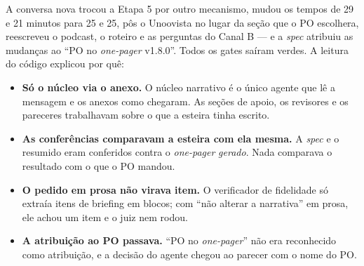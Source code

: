 \documentclass[11pt,a4paper]{article}
\newcommand{\bolinha}[1]{\tikz[baseline=-0.5ex]{\fill[#1] (0,0) circle (0.33em);}}
\newcommand{\statusVerde}{\bolinha{sinalVerde}}
\begin{document}
\begin{center}
\end{center}

A conversa nova trocou a Etapa 5 por outro mecanismo, mudou os tempos de 29 e 21 minutos para 25 e 25, pôs o Unoovista no lugar da seção que o PO escolhera, reescreveu o podcast, o roteiro e as perguntas do Canal B --- e a \emph{spec} atribuiu as mudanças ao ``PO no \emph{one-pager} v1.8.0''. Todos os gates saíram verdes. A leitura do código explicou por quê:

\begin{itemize}
  \item \textbf{Só o núcleo via o anexo.} O núcleo narrativo é o único agente que lê a mensagem e os anexos como chegaram. As seções de apoio, os revisores e os pareceres trabalhavam sobre o que a esteira tinha escrito.
  \item \textbf{As conferências comparavam a esteira com ela mesma.} A \emph{spec} e o resumido eram conferidos contra o \emph{one-pager} \emph{gerado}. Nada comparava o resultado com o que o PO mandou.
  \item \textbf{O pedido em prosa não virava item.} O verificador de fidelidade só extraía itens de briefing em blocos; com ``não alterar a narrativa'' em prosa, ele achou um item e o juiz nem rodou.
  \item \textbf{A atribuição ao PO passava.} ``PO no \emph{one-pager}'' não era reconhecido como atribuição, e a decisão do agente chegou ao parecer com o nome do PO.
\end{itemize}
\end{document}
